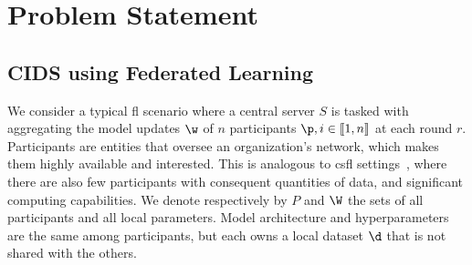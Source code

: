 \section{Problem Statement}\label{sec:problem}


\subsection{CIDS using Federated Learning}
\label{sec:problem.cids}

We consider a typical \gls{fl} scenario where a central server $S$ is tasked with aggregating the model updates $\w$ of $n$ participants $\p, i\in \llbracket 1,n \rrbracket$ at each round $r$.
Participants are entities that oversee an organization's network, which makes them highly available and interested.
This is analogous to \gls{csfl} settings~\cite{kairouz_advances_2021}, where there are also few participants with consequent quantities of data, and significant computing capabilities.
We denote respectively by $P$ and $\W$ the sets of all participants and all local parameters.
Model architecture and hyperparameters are the same among participants, but each owns a local dataset $\d$ that is not shared with the others.

